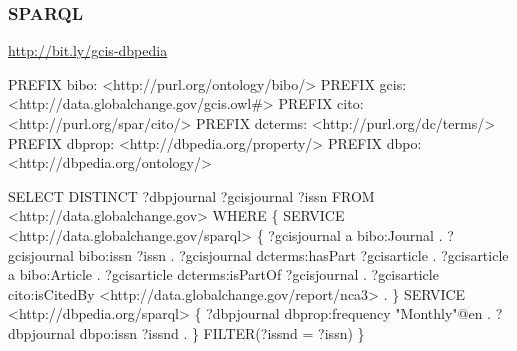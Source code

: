 \documentclass{beamer}
\begin{document}





\begin{frame}[fragile]
    \frametitle{SPARQL}
     \url{http://bit.ly/gcis-dbpedia}
\begin{tiny}
\begin{semiverbatim}
    PREFIX bibo: <http://purl.org/ontology/bibo/>
    PREFIX gcis: <http://data.globalchange.gov/gcis.owl#>
    PREFIX cito: <http://purl.org/spar/cito/>
    PREFIX dcterms: <http://purl.org/dc/terms/>
    PREFIX dbprop: <http://dbpedia.org/property/>
    PREFIX dbpo: <http://dbpedia.org/ontology/>

    SELECT  DISTINCT ?dbpjournal ?gcisjournal ?issn
    FROM <http://data.globalchange.gov>
    WHERE \{
        SERVICE <http://data.globalchange.gov/sparql> \{
            ?gcisjournal a bibo:Journal .
            ?gcisjournal bibo:issn ?issn .
            ?gcisjournal dcterms:hasPart ?gcisarticle .
            ?gcisarticle a bibo:Article .
            ?gcisarticle dcterms:isPartOf ?gcisjournal .
            ?gcisarticle cito:isCitedBy <http://data.globalchange.gov/report/nca3> .
         \}
       SERVICE <http://dbpedia.org/sparql> \{
        ?dbpjournal dbprop:frequency "Monthly"@en .
        ?dbpjournal dbpo:issn ?issnd .
        \}
      FILTER(?issnd = ?issn)
    \}
\end{semiverbatim}
\end{tiny}

\end{frame}
\end{document}

